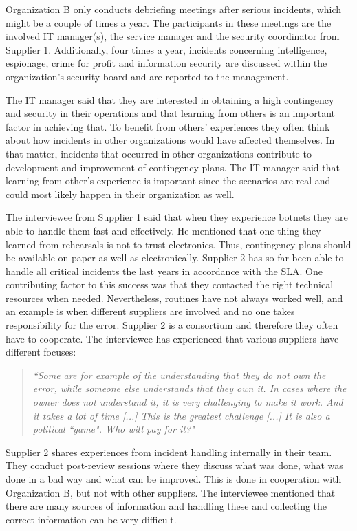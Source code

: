 Organization B only conducts debriefing meetings after serious incidents, which might be a couple of times a year. The participants in these meetings are the involved IT manager(s), the service manager and the security coordinator from Supplier 1. Additionally, four times a year, incidents concerning intelligence, espionage, crime for profit and information security are discussed within the organization's security board and are reported to the management. 

The IT manager said that they are interested in obtaining a high contingency and security in their operations and that learning from others is an important factor in achieving that. To benefit from others' experiences they often think about how incidents in other organizations would have affected themselves. In that matter, incidents that occurred in other organizations contribute to development and improvement of contingency plans. The IT manager said that learning from other's experience is important since the scenarios are real and could most likely happen in their organization as well.

The interviewee from Supplier 1 said that when they experience botnets they are able to handle them fast and effectively. He mentioned that one thing they learned from rehearsals is not to trust electronics. Thus, contingency plans should be available on paper as well as electronically. Supplier 2 has so far been able to handle all critical incidents the last years in accordance with the \ac{SLA}. One contributing factor to this success was that they contacted the right technical resources when needed. Nevertheless, routines have not always worked well, and an example is when different suppliers are involved and no one takes responsibility for the error. Supplier 2 is a consortium and therefore they often have to cooperate. The interviewee has experienced that various suppliers have different focuses:

\begin{quote}
\textit{``Some are for example of the understanding that they do not own the error, while someone else understands that they own it. In cases where the owner does not understand it, it is very challenging to make it work. And it takes a lot of time [...] This is the greatest challenge [...] It is also a political ``game". Who will pay for it?"}
\end{quote}

Supplier 2 shares experiences from incident handling internally in their team. They conduct post-review sessions where they discuss what was done, what was done in a bad way and what can be improved. This is done in cooperation with Organization B, but not with other suppliers. The interviewee mentioned that there are many sources of information and handling these and collecting the correct information can be very difficult.


